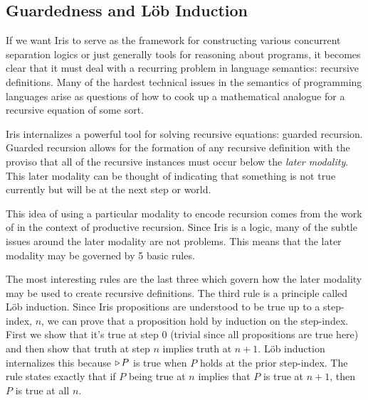 \documentclass{amsart}
\newcommand{\provesJ}[3]{#1 \mathop{\vert} #2 \proves #3}
\begin{document}
\subsection{Guardedness and L\"{o}b Induction}\label{subsec:guarded}

If we want Iris to serve as the framework for constructing various
concurrent separation logics or just generally tools for reasoning
about programs, it becomes clear that it must deal with a recurring
problem in language semantics: recursive definitions. Many of the
hardest technical issues in the semantics of programming languages
arise as questions of how to cook up a mathematical analogue for a
recursive equation of some sort.

Iris internalizes a powerful tool for solving recursive equations:
guarded recursion. Guarded recursion allows for the formation of any
recursive definition with the proviso that all of the recursive
instances must occur below the \emph{later modality}. This later
modality can be thought of indicating that something is not true
currently but will be at the next step or world.

This idea of using a particular modality to encode recursion comes
from the work of \citet{Nakano:00} in the context of productive
recursion. Since Iris is a logic, many of the subtle issues around the
later modality are not problems. This means that the later modality
may be governed by 5 basic rules.
The most interesting rules are the last three which govern how the
later modality may be used to create recursive definitions. The third
rule is a principle called L\"ob induction. Since Iris propositions
are understood to be true up to a step-index, $n$, we can prove that a
proposition hold by induction on the step-index. First we show that
it's true at step $0$ (trivial since all propositions are true here)
and then show that truth at step $n$ implies truth at $n + 1$. L\"ob
induction internalizes this because $\mathop{{\triangleright}} P$ is true when $P$ holds
at the prior step-index. The rule states exactly that if $P$ being
true at $n$ implies that $P$ is true at $n + 1$, then $P$ is true at
all $n$.
\end{document}
